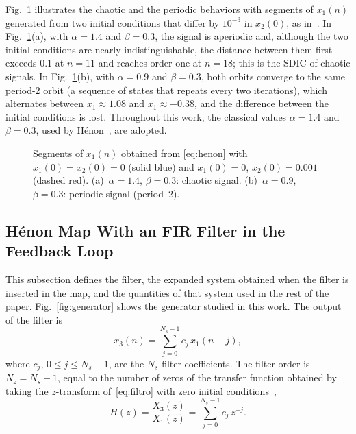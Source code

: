 \documentclass[journal]{IEEEtran}
\begin{document}
Fig.~\ref{fig:henon} illustrates the chaotic and the periodic behaviors with
segments of $x_1(n)$ generated from two initial conditions that differ by
$10^{-3}$ in $x_2(0)$, as in~\cite{Borges2022sbrt}. In
Fig.~\ref{fig:henon}(a), with $\alpha=1.4$ and $\beta=0.3$, the signal is
aperiodic and, although the two initial conditions are nearly
indistinguishable, the distance between them first exceeds $0.1$ at $n=11$
and reaches order one at $n=18$; this is the SDIC of chaotic signals. In Fig.~\ref{fig:henon}(b),
with $\alpha=0.9$ and $\beta=0.3$, both orbits converge to the same period-2
orbit (a sequence of states that repeats every two iterations), which alternates between $x_1\approx1.08$ and $x_1\approx-0.38$, and
the difference between the initial conditions is lost.
Throughout this work, the classical values $\alpha=1.4$ and $\beta=0.3$, used by
H\'enon~\cite{Henon1976}, are adopted.

\begin{figure}[!t]
\centering

\caption{Segments of $x_1(n)$ obtained from \eqref{eq:henon} with
$x_1(0)=x_2(0)=0$ (solid blue) and $x_1(0)=0$, $x_2(0)=0.001$ (dashed red).
(a)~$\alpha=1.4$, $\beta=0.3$: chaotic signal. (b)~$\alpha=0.9$, $\beta=0.3$:
periodic signal (period~2).}
\label{fig:henon}
\end{figure}

\subsection{H\'enon Map With an FIR Filter in the Feedback Loop}\label{sub:expanded}


This subsection defines the filter, the expanded system obtained when the
filter is inserted in the map, and the quantities of that system used in the
rest of the paper. Fig.~\ref{fig:generator} shows the generator studied in this work. The output of the filter is
\begin{equation}
  x_3(n) = \sum_{j=0}^{N_s-1} c_j\, x_1(n-j),
  \label{eq:filtro}
\end{equation}
where $c_j$, $0\le j\le N_s-1$, are the $N_s$ filter coefficients. The filter
order is $N_z=N_s-1$, equal to the number of zeros of the transfer function
obtained by taking the $z$-transform of~\eqref{eq:filtro} with zero initial
conditions~\cite{Oppenheim2009},
\begin{equation}
  H(z)=\frac{X_3(z)}{X_1(z)}=\sum_{j=0}^{N_s-1} c_j\, z^{-j}.
  \label{eq:tf}
\end{equation}
\end{document}
